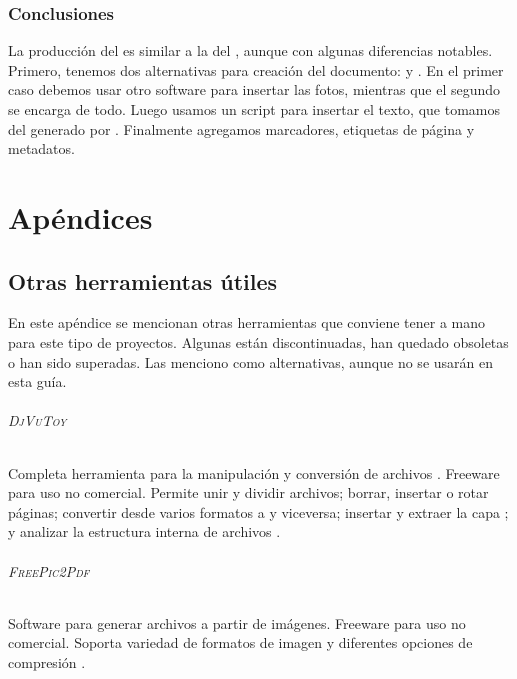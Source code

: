 \documentclass[%
	a5paper,
	10pt,
	twoside,
	openright,
	final,
]{memoir}
\begin{document}
{	

	\section{Conclusiones} La producción del \djvu es similar a la del \pdf, aunque con algunas diferencias notables. Primero, tenemos dos alternativas para creación del documento: \djvusmall y \djvusmallmod. En el primer caso debemos usar otro software para insertar las fotos, mientras que el segundo se encarga de todo. Luego usamos un script para insertar el texto, que tomamos del \djvu generado por \abbyy. Finalmente agregamos marcadores, etiquetas de página y metadatos.

	\part{Apéndices}\appendix

	\chapter{Otras herramientas útiles} En este apéndice se mencionan otras herramientas que conviene tener a mano para este tipo de proyectos. Algunas están discontinuadas, han quedado obsoletas o han sido superadas. Las menciono como alternativas, aunque no se usarán en esta guía.

	\paragraph{\textsc{DjVuToy}} Completa herramienta para la manipulación y conversión de archivos \djvu. Freeware para uso no comercial. Permite unir y dividir archivos; borrar, insertar o rotar páginas; convertir desde varios formatos a \djvu y viceversa; insertar y extraer la capa \ocr; y analizar la estructura interna de archivos \djvu \cite{DjVuToy}.
	\paragraph{\textsc{FreePic2Pdf}} Software para generar archivos \pdf a partir de imágenes. Freeware para uso no comercial. Soporta variedad de formatos de imagen y diferentes opciones de compresión \cite{FreePic2Pdf}.
}
\end{document}
